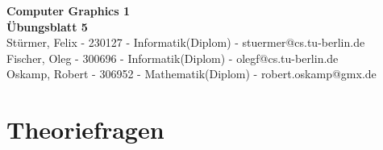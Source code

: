 \documentclass[a4paper,10pt]{scrartcl}
\begin{document}
 \begin{center}
{\huge \bfseries Computer Graphics 1\\[0.5cm]Übungsblatt 5}\\[1.0cm]
  
  Stürmer, Felix - 230127 - Informatik(Diplom) - stuermer@cs.tu-berlin.de\\
  Fischer, Oleg - 300696 - Informatik(Diplom) - olegf@cs.tu-berlin.de\\
  Oskamp, Robert - 306952 - Mathematik(Diplom) - robert.oskamp@gmx.de\\[2.0cm]
 \end{center}
\section{Theoriefragen}
\end{document}
